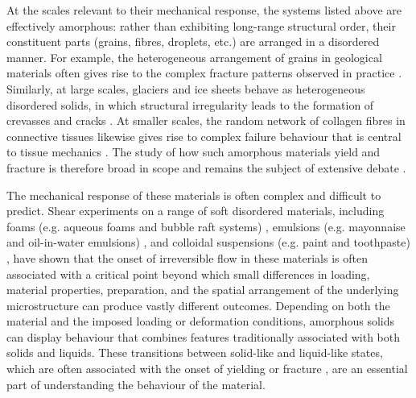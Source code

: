 \documentclass[asymmetricmargins]{library/duthesis}%
\begin{document}
At the scales relevant to their mechanical response, the systems listed above are effectively amorphous: rather than exhibiting long-range structural order, their constituent parts (grains, fibres, droplets, etc.) are arranged in a disordered manner.
For example, the heterogeneous arrangement of grains in geological materials often gives rise to the complex fracture patterns observed in practice \cite{Cocco2023}. Similarly, at large scales, glaciers and ice sheets behave as heterogeneous disordered solids, in which structural irregularity leads to the formation of crevasses and cracks \cite{Jennings2021}. At smaller scales, the random network of collagen fibres in connective tissues likewise gives rise to complex failure behaviour that is central to tissue mechanics \cite{Burla2020,ruiz-franco_force_2022}. The study of how such amorphous materials yield and fracture is therefore broad in scope and remains the subject of extensive debate \cite{falk_deformation_2011,nicolas_deformation_2018,larson_structure_1999,bonn_yield_2017}.

The mechanical response of these materials is often complex and difficult to predict. Shear experiments on a range of soft disordered materials, including foams (e.g. aqueous foams and bubble raft systems) \cite{durian_foam_1995,Khan1988,WEAIRE2008}, emulsions (e.g. mayonnaise and oil-in-water emulsions) \cite{Mason1996,Datta2011,Derkach2009,AbuJdayil2003}, and colloidal suspensions (e.g. paint and toothpaste) \cite{Mewis2011,Koumakis2011,Petekidis2004,Cloitre2003}, have shown that the onset of irreversible flow in these materials is often associated with a critical point \cite{nicolas_deformation_2018,Divoux2024,lin_scaling_2014,Ozawa2018,Dahmen2011} beyond which small differences in loading, material properties, preparation, and the spatial arrangement of the underlying microstructure can produce vastly different outcomes. Depending on both the material and the imposed loading or deformation conditions, amorphous solids can display behaviour that combines features traditionally associated with both solids and liquids. These transitions between solid-like and liquid-like states, which are often associated with the onset of yielding or fracture \cite{nicolas_deformation_2018,Divoux2024,lin_scaling_2014,Ozawa2018,Dahmen2011}, are an essential part of understanding the behaviour of the material.
\end{document}
